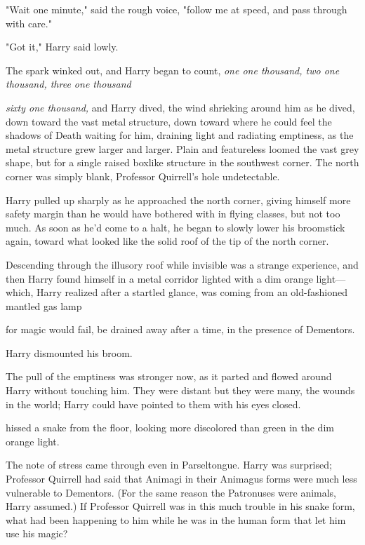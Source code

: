 "Wait one minute," said the rough voice, "follow me at speed, and pass through
with care."

"Got it," Harry said lowly.

The spark winked out, and Harry began to count, \emph{one one thousand, two one
thousand, three one thousand{\el}}

\emph{{\el} sixty one thousand,} and Harry dived, the wind shrieking around
him as he dived, down toward the vast metal structure, down toward where he
could feel the shadows of Death waiting for him, draining light and radiating
emptiness, as the metal structure grew larger and larger. Plain and featureless
loomed the vast grey shape, but for a single raised boxlike structure in the
southwest corner. The north corner was simply blank, Professor Quirrell's hole
undetectable.

Harry pulled up sharply as he approached the north corner, giving himself more
safety margin than he would have bothered with in flying classes, but not too
much. As soon as he'd come to a halt, he began to slowly lower his broomstick
again, toward what looked like the solid roof of the tip of the north corner.

Descending through the illusory roof while invisible was a strange experience,
and then Harry found himself in a metal corridor lighted with a dim orange
light---which, Harry realized after a startled glance, was coming from an
old-fashioned mantled gas lamp{\el}

{\el} for magic would fail, be drained away after a time, in the presence of
Dementors.

Harry dismounted his broom.

The pull of the emptiness was stronger now, as it parted and flowed around
Harry without touching him. They were distant but they were many, the wounds in
the world; Harry could have pointed to them with his eyes closed.

 hissed a snake from the floor, looking more
discolored than green in the dim orange light.

The note of stress came through even in Parseltongue. Harry was surprised;
Professor Quirrell had said that Animagi in their Animagus forms were much less
vulnerable to Dementors. (For the same reason the Patronuses were animals,
Harry assumed.) If Professor Quirrell was in this much trouble in his snake
form, what had been happening to him while he was in the human form that let
him use his magic\el?

